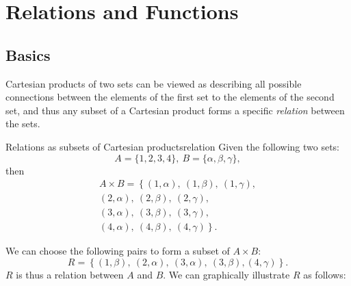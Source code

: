 \section{Relations and Functions}
\subsection{Basics}
Cartesian products of two sets can be viewed as describing all possible connections between the elements of the first set to the elements of the second set, and thus any subset of a Cartesian product forms a specific \emph{relation} between the sets.

\begin{example}{Relations as subsets of Cartesian products}{relation}
	Given the following two sets:
	\[
		A=\{1,2,3,4\},\ B=\{\alpha,\beta,\gamma\},
	\]
	then
	\begin{align*}
		A\times B = \left\{ (1,\alpha),\ (1,\beta),\ (1,\gamma), \right.\\
												(2,\alpha),\ (2,\beta),\ (2,\gamma),\\
												(3,\alpha),\ (3,\beta),\ (3,\gamma),\\
							  \left.	(4,\alpha),\ (4,\beta),\ (4,\gamma) \right\}.
	\end{align*}

	We can choose the following pairs to form a subset of $A\times B$:
	\[
		R = \left\{ (1,\beta),\ (2,\alpha),\ (3,\alpha),\ (3,\beta), (4,\gamma)  \right\}.
	\]
	$R$ is thus a relation between $A$ and $B$. We can graphically illustrate $R$ as follows:
	\begin{figure}[H]
		\centering
	\end{figure}
\end{example}

